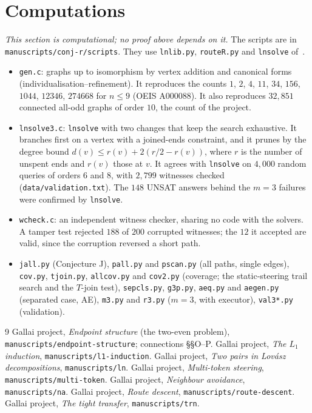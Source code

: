 \documentclass[11pt]{amsart}
\theoremstyle{definition}
\begin{document}
\section{Computations}\label{sec:comp}
\emph{This section is computational; no proof above depends on it.} The scripts are in
\texttt{manuscripts/conj-r/scripts}. They use \texttt{lnlib.py}, \texttt{routeR.py} and
\texttt{lnsolve} of~\cite{LN}.
\begin{itemize}
\item \texttt{gen.c}: graphs up to isomorphism by vertex addition and canonical forms
(individualisation--refinement). It reproduces the counts $1$, $2$, $4$, $11$, $34$, $156$, $1044$,
$12346$, $274668$ for $n\le9$ (OEIS A000088). It also reproduces $32{,}851$ connected all-odd graphs of order $10$, the count of the project.
\item \texttt{lnsolve3.c}: \texttt{lnsolve} with two changes that keep the search exhaustive. It
branches first on a vertex with a joined-ends constraint, and it prunes by the degree bound
$d(v)\le r(v)+2(r/2-r(v))$, where $r$ is the number of unspent ends and $r(v)$ those at $v$. It agrees with
\texttt{lnsolve} on $4{,}000$ random queries of orders $6$ and $8$, with $2{,}799$ witnesses checked
(\texttt{data/validation.txt}). The $148$ UNSAT answers behind the $m=3$ failures were confirmed by \texttt{lnsolve}.
\item \texttt{wcheck.c}: an independent witness checker, sharing no code with the solvers. A tamper test
rejected $188$ of $200$ corrupted witnesses; the $12$ it accepted are valid, since the corruption
reversed a short path.
\item \texttt{jall.py} (Conjecture J), \texttt{pall.py} and \texttt{pscan.py} (all paths, single
edges), \texttt{cov.py}, \texttt{tjoin.py}, \texttt{allcov.py} and \texttt{cov2.py} (coverage; the static-steering trail search and
the $T$-join test), \texttt{sepcls.py}, \texttt{g3p.py}, \texttt{aeq.py} and \texttt{aegen.py} (separated case, AE),
\texttt{m3.py} and \texttt{r3.py} ($m=3$, with executor), \texttt{val3*.py} (validation).
\end{itemize}

\begin{thebibliography}{9}
 Gallai project, \emph{Endpoint structure} (the two-even problem),
\texttt{manuscripts/endpoint-structure}; connections \S\S O--P.
 Gallai project, \emph{The $L_1$ induction}, \texttt{manuscripts/l1-induction}.
 Gallai project, \emph{Two pairs in Lov\'asz decompositions}, \texttt{manuscripts/ln}.
 Gallai project, \emph{Multi-token steering}, \texttt{manuscripts/multi-token}.
 Gallai project, \emph{Neighbour avoidance}, \texttt{manuscripts/na}.
 Gallai project, \emph{Route descent}, \texttt{manuscripts/route-descent}.
 Gallai project, \emph{The tight transfer}, \texttt{manuscripts/trn}.
\end{thebibliography}
\end{document}
